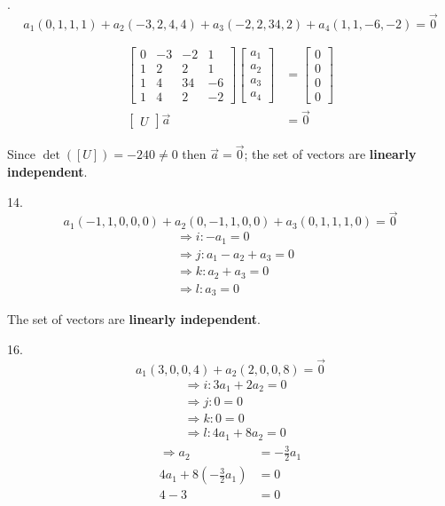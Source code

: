 \documentclass[11pt]{homework}
\begin{document}
. 
\begin{equation*}
a_1 (0,1,1,1) + a_2  (-3,2,4,4) + a_3  (-2,2,34,2) +  a_4  (1,1,-6,-2) = \vec 0
\end{equation*}

\begin{align*}
\begin{bmatrix}
  0 & -3  & -2 & 1 \\
  1 &  2  &  2 & 1 \\
  1 &  4  & 34 & -6 \\
  1 &  4  &  2 & -2 
\end{bmatrix}
\begin{bmatrix}
 a_1 \\
 a_2 \\
 a_3 \\
 a_4 
\end{bmatrix}
&=
\begin{bmatrix}
 0 \\
 0 \\
 0 \\
 0 
\end{bmatrix} 
\\
\begin{bmatrix}
U
\end{bmatrix}
\vec a 
&= 
\vec 0
\end{align*}

Since $\det ([U]) = -240 \neq 0$ then $\vec a = \vec 0$;
the set of vectors are \textbf{linearly independent}.

14. 
\begin{equation*}
a_1  (-1,1,0,0,0) + a_2  (0,-1,1,0,0) + a_3  (0,1,1,1,0) = \vec 0 
\end{equation*}
\begin{align*}
& \Rightarrow i: -a_1 = 0  \\
& \Rightarrow j: a_1 - a_2 + a_3 = 0  \\
& \Rightarrow k: a_2 + a_3 = 0  \\
& \Rightarrow l: a_3 = 0  
\end{align*}

The set of vectors are \textbf{linearly independent}.

16. 
\begin{equation*}
a_1  (3,0,0,4) + a_2  (2,0,0,8) = \vec 0
\end{equation*}
\begin{align*}
& \Rightarrow i: 3 a_1 + 2 a_2 = 0  \\
& \Rightarrow j:  0 = 0 \\
& \Rightarrow k:  0 = 0 \\
& \Rightarrow l: 4 a_1 + 8 a_2 = 0
\end{align*}
\begin{align*}
\Rightarrow a_2 &= -\frac{3}{2} a_1 \\
 4 a_1 + 8 ( -\frac{3}{2} a_1) &= 0 \\
 4 - 3 &= 0
\end{align*}
\end{document}
